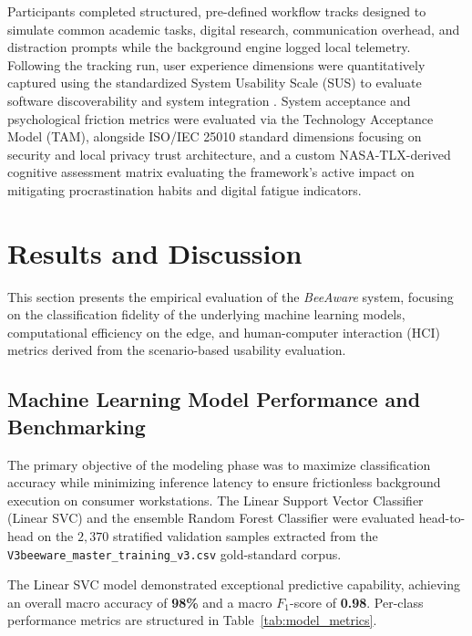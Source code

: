 \documentclass[conference]{IEEEtran}
\begin{document}
Participants completed structured, pre-defined workflow tracks designed to simulate common academic tasks, digital research, communication overhead, and distraction prompts while the background engine logged local telemetry. Following the tracking run, user experience dimensions were quantitatively captured using the standardized System Usability Scale (SUS) to evaluate software discoverability and system integration \cite{Bangor2008, Sauro2016}. System acceptance and psychological friction metrics were evaluated via the Technology Acceptance Model (TAM), alongside ISO/IEC 25010 standard dimensions focusing on security and local privacy trust architecture, and a custom NASA-TLX-derived cognitive assessment matrix evaluating the framework's active impact on mitigating procrastination habits and digital fatigue indicators.

\section{Results and Discussion}
This section presents the empirical evaluation of the \emph{BeeAware} system, focusing on the classification fidelity of the underlying machine learning models, computational efficiency on the edge, and human-computer interaction (HCI) metrics derived from the scenario-based usability evaluation.

\subsection{Machine Learning Model Performance and Benchmarking}
The primary objective of the modeling phase was to maximize classification accuracy while minimizing inference latency to ensure frictionless background execution on consumer workstations. The Linear Support Vector Classifier (Linear SVC) and the ensemble Random Forest Classifier were evaluated head-to-head on the $2,370$ stratified validation samples extracted from the \texttt{V3beeware\_master\_training\_v3.csv} gold-standard corpus.

The Linear SVC model demonstrated exceptional predictive capability, achieving an overall macro accuracy of \textbf{98\%} and a macro $F_1$-score of \textbf{0.98}. Per-class performance metrics are structured in Table~\ref{tab:model_metrics}.
\end{document}
